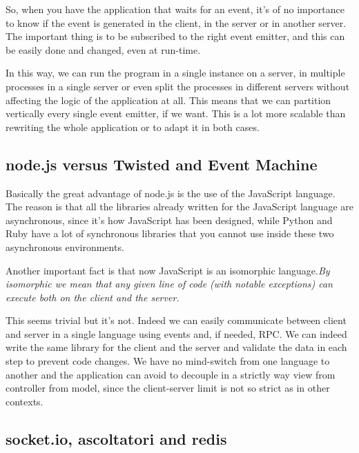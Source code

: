 So, when you have the application that waits for an event, it's of no importance to know if the event is generated in the client, in the server or in another server. The important thing is to be subscribed to the right event emitter, and this can be easily done and changed, even at run-time.

In this way, we can run the program in a single instance on a server, in multiple processes in a single server or even split the processes in different servers without affecting the logic of the application at all. This means that we can partition vertically every single event emitter, if we want. This is a lot more scalable than rewriting the whole application or to adapt it in both cases.

\subsection{node.js versus Twisted and Event Machine}

Basically the great advantage of node.js is the use of the JavaScript language. The reason is that all the libraries already written for the JavaScript language are asynchronous, since it's how JavaScript has been designed, while Python and Ruby have a lot of synchronous libraries that you cannot use inside these two asynchronous environments.

Another important fact is that now JavaScript is an isomorphic language.\textit{By isomorphic we mean that any given line of code (with notable exceptions) can execute both on the client and the server.}\cite{website:isomorfic}

This seems trivial but it's not. Indeed we can easily communicate between client and server in a single language using events and, if needed, RPC. We can indeed write the same library for the client and the server and validate the data in each step to prevent code changes. We have no mind-switch from one language to another and the application can avoid to decouple in a strictly way view from controller from model, since the client-server limit is not so strict as in other contexts.

\subsection{socket.io, ascoltatori and redis}

